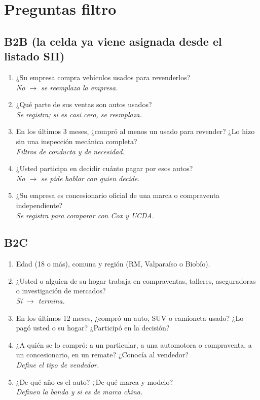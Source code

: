 \documentclass[11pt,a4paper]{article}
\begin{document}
\newpage
\appendix
\section{Preguntas filtro}
\subsection*{B2B (la celda ya viene asignada desde el listado SII)}
\begin{enumerate}[label=F\arabic*.]
\item ¿Su empresa compra vehículos usados para revenderlos? \\ \emph{No $\rightarrow$ se reemplaza la empresa.}
\item ¿Qué parte de sus ventas son autos usados? \\ \emph{Se registra; si es casi cero, se reemplaza.}
\item En los últimos 3 meses, ¿compró al menos un usado para revender? ¿Lo hizo sin una inspección mecánica completa? \\ \emph{Filtros de conducta y de necesidad.}
\item ¿Usted participa en decidir cuánto pagar por esos autos? \\ \emph{No $\rightarrow$ se pide hablar con quien decide.}
\item ¿Su empresa es concesionario oficial de una marca o compraventa independiente? \\ \emph{Se registra para comparar con Cox y UCDA.}
\end{enumerate}
\subsection*{B2C}
\begin{enumerate}[label=F\arabic*.]
\item Edad (18 o más), comuna y región (RM, Valparaíso o Biobío).
\item ¿Usted o alguien de su hogar trabaja en compraventas, talleres, aseguradoras o investigación de mercados? \\ \emph{Sí $\rightarrow$ termina.}
\item En los últimos 12 meses, ¿compró un auto, SUV o camioneta usado? ¿Lo pagó usted o su hogar? ¿Participó en la decisión?
\item ¿A quién se lo compró: a un particular, a una automotora o compraventa, a un concesionario, en un remate? ¿Conocía al vendedor? \\ \emph{Define el tipo de vendedor.}
\item ¿De qué año es el auto? ¿De qué marca y modelo? \\ \emph{Definen la banda y si es de marca china.}
\end{enumerate}
\end{document}
